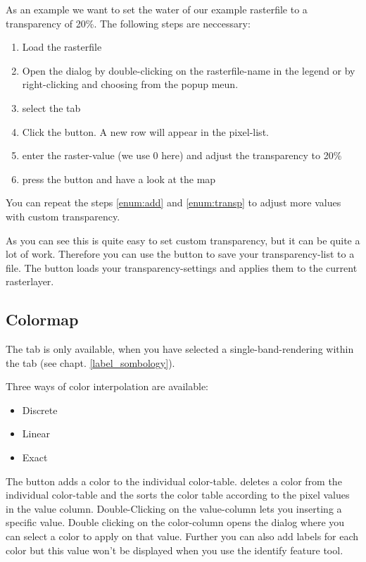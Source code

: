 As an example we want to set the water of our example rasterfile
 to a transparency of 20\%. The following steps
are neccessary:
\begin{enumerate}
 \item  Load the rasterfile 
 \item Open the  dialog by double-clicking on the
 rasterfile-name in the legend or by right-clicking and choosing
  from the popup meun.
 \item select the  tab
 \item \label{enum:add} Click the 
 button. A new row will appear in the pixel-list.
 \item \label{enum:transp} enter the raster-value (we use 0 here) and adjust the
 transparency to 20\%
 \item press the  button and have a look at the map
\end{enumerate}

You can repeat the steps \ref{enum:add} and \ref{enum:transp} to adjust
more values with custom transparency.

As you can see this is quite easy to set custom transparency, but it can be
quite a lot of work. Therefore you can use the button
 to save your
transparency-list to a file. The button
 loads your
transparency-settings and applies them to the current rasterlayer.

\subsection{Colormap} \label{label_colormaptab}

The  tab is only available, when you have selected a
single-band-rendering within the  tab (see chapt. \ref{label_sombology}).

Three ways of color interpolation are available:
\begin{itemize}[label=--]
\item Discrete
\item Linear
\item Exact
\end{itemize}

The button  adds a color to the individual color-table. 
 deletes a color from the individual color-table and the 
 sorts the color table according to the pixel values in the 
value column. Double-Clicking on the value-column lets you inserting a 
specific value. Double clicking on the color-column opens the dialog 
 where you can select a color to apply on that value. Further you can also add labels for each color but this value won't be displayed when you use the identify feature tool.   

